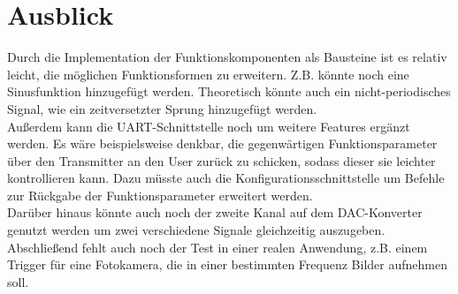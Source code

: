 \chapter{Ausblick}
Durch die Implementation der Funktionskomponenten als Bausteine ist es relativ leicht, die möglichen Funktionsformen zu erweitern.
Z.B. könnte noch eine Sinusfunktion hinzugefügt werden.
Theoretisch könnte auch ein nicht-periodisches Signal, wie ein zeitversetzter Sprung hinzugefügt werden.\\
Außerdem kann die UART-Schnittstelle noch um weitere Features ergänzt werden.
Es wäre beispielsweise denkbar, die gegenwärtigen Funktionsparameter über den Transmitter an den User zurück zu schicken, sodass dieser sie leichter kontrollieren kann.
Dazu müsste auch die Konfigurationsschnittstelle um Befehle zur Rückgabe der Funktionsparameter erweitert werden. \\
Darüber hinaus könnte auch noch der zweite Kanal auf dem DAC-Konverter genutzt werden um zwei verschiedene Signale gleichzeitig auszugeben. \\
Abschließend fehlt auch noch der Test in einer realen Anwendung, z.B. einem Trigger für eine Fotokamera, die in einer bestimmten Frequenz Bilder aufnehmen soll.